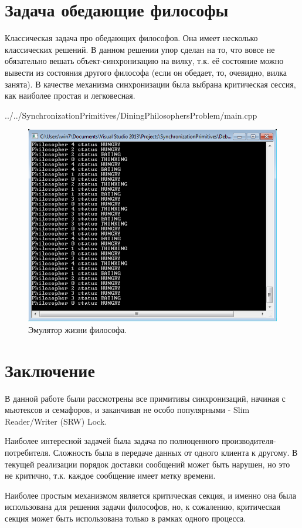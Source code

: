 \documentclass[a4paper, 12pt]{article}		%
\begin{document}
\newpage
\section{Задача обедающие философы}

Классическая задача про обедающих философов. Она имеет несколько классических решений. В данном решении упор сделан на то, что вовсе не обязательно вешать объект-синхронизацию на вилку, т.к. её состояние можно вывести из состояния другого философа (если он обедает, то, очевидно, вилка занята). В качестве механизма синхронизации была выбрана критическая сессия, как наиболее простая и легковесная.


{../../SynchronizationPrimitives/DiningPhilosophersProblem/main.cpp}

\begin{figure}[h!]
\centering
\includegraphics[scale=0.8]{res/010}
\caption{Эмулятор жизни философа.}
\end{figure}

\newpage
\section*{Заключение}

В данной работе были рассмотрены все примитивы синхронизаций, начиная с мьютексов и семафоров, и заканчивая не особо популярными - Slim Reader/Writer (SRW) Lock.

Наиболее интересной задачей была задача по полноценного производителя-потребителя. Сложность была в передаче данных от одного клиента к другому. В текущей реализации порядок доставки сообщений может быть нарушен, но это не критично, т.к. каждое сообщение имеет метку времени.

Наиболее простым механизмом является критическая секция, и именно она была использована для решения задачи философов, но, к сожалению, критическая секция может быть использована только в рамках одного процесса.
\end{document}
